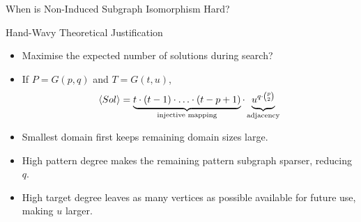\documentclass[aspectratio=169,compress,10pt]{beamer}
\begin{document}
\begin{frame}{When is Non-Induced Subgraph Isomorphism Hard?}
\begin{center}
{
        }
    \end{center}
\end{frame}

\begin{frame}{Hand-Wavy Theoretical Justification}
    \begin{itemize}
        \item Maximise the expected number of solutions during search?
        \item If $P = G(p, q)$ and $T = G(t, u)$,
            \begin{equation*} \langle Sol \rangle = \underbrace{t \cdot (t - 1) \cdot \ldots \cdot (t
                - p + 1)}_{\textnormal{injective mapping}} \cdot \underbrace{\vphantom{(p)}{u}^{q \cdot
            \binom{p}{2}}}_{\textnormal{adjacency}} \end{equation*}
        \item Smallest domain first keeps remaining domain sizes large.
        \item High pattern degree makes the remaining pattern subgraph sparser, reducing $q$.
        \item High target degree leaves as many vertices as possible available for future
            use, making $u$ larger.
    \end{itemize}
\end{frame}
\end{document}
